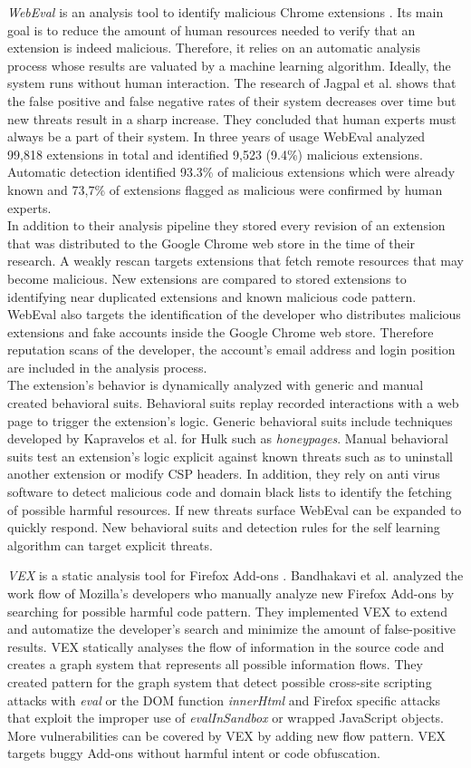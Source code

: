 	\textit{WebEval} is an analysis tool to identify malicious Chrome extensions \cite{190984}. Its main goal is to reduce the amount of human resources needed to verify that an extension is indeed malicious. Therefore, it relies on an automatic analysis process whose results are valuated by a machine learning algorithm. Ideally, the system runs without human interaction. The research of Jagpal et al. shows that the false positive and false negative rates of their system decreases over time but new threats result in a sharp increase. They concluded that human experts must always be a part of their system. In three years of usage WebEval analyzed 99,818 extensions in total and identified 9,523 (9.4\%) malicious extensions. Automatic detection identified 93.3\% of malicious extensions which were already known and 73,7\% of extensions flagged as malicious were confirmed by human experts. \\
	In addition to their analysis pipeline they stored every revision of an extension that was distributed to the Google Chrome web store in the time of their research. A weakly rescan targets extensions that fetch remote resources that may become malicious. New extensions are compared to stored extensions to identifying near duplicated extensions and known malicious code pattern. WebEval also targets the identification of the developer who distributes malicious extensions and fake accounts inside the Google Chrome web store. Therefore reputation scans of the developer, the account's email address and login position are included in the analysis process.  \\
	The extension's behavior is dynamically analyzed with generic and manual created behavioral suits. Behavioral suits replay recorded interactions with a web page to trigger the extension's logic. Generic behavioral suits include techniques developed by Kapravelos	et al. for Hulk \cite{184485} such as \textit{honeypages}. Manual behavioral suits test an extension's logic explicit against known threats such as to uninstall another extension or modify CSP headers. In addition, they rely on anti virus software to detect malicious code and domain black lists to identify the fetching of possible harmful resources. If new threats surface WebEval can be expanded to quickly respond. New behavioral suits and detection rules for the self learning algorithm can target explicit threats. 
	
	\textit{VEX} is a static analysis tool for Firefox Add-ons \cite{Bandhakavi:2011:VBE:1995376.1995398}. Bandhakavi et al. analyzed the work flow of Mozilla's developers who manually analyze new Firefox Add-ons by searching for possible harmful code pattern. They implemented VEX to extend and automatize the developer's search and minimize the amount of false-positive results. VEX statically analyses the flow of information in the source code and creates a graph system that represents all possible information flows. They created pattern for the graph system that detect possible cross-site scripting attacks with \textit{eval} or the DOM function \textit{innerHtml} and Firefox specific attacks that exploit the improper use of \textit{evalInSandbox} or wrapped JavaScript objects. More vulnerabilities can be covered by VEX by adding new flow pattern. VEX targets buggy Add-ons without harmful intent or code obfuscation. 
	